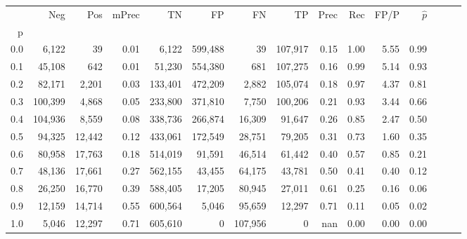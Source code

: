 \begin{tabular}{rrrrrrrrrrrrrrr}
\toprule
{} &      Neg &     Pos & mPrec &       TN &       FP &       FN &       TP &  Prec &   Rec &  FP/P & $\hat{p}$ \\
p   &          &         &       &          &          &          &          &       &       &       &           \\
\midrule
0.0 &    6,122 &      39 &  0.01 &    6,122 &  599,488 &       39 &  107,917 &  0.15 &  1.00 &  5.55 &      0.99 \\
0.1 &   45,108 &     642 &  0.01 &   51,230 &  554,380 &      681 &  107,275 &  0.16 &  0.99 &  5.14 &      0.93 \\
0.2 &   82,171 &   2,201 &  0.03 &  133,401 &  472,209 &    2,882 &  105,074 &  0.18 &  0.97 &  4.37 &      0.81 \\
0.3 &  100,399 &   4,868 &  0.05 &  233,800 &  371,810 &    7,750 &  100,206 &  0.21 &  0.93 &  3.44 &      0.66 \\
0.4 &  104,936 &   8,559 &  0.08 &  338,736 &  266,874 &   16,309 &   91,647 &  0.26 &  0.85 &  2.47 &      0.50 \\
0.5 &   94,325 &  12,442 &  0.12 &  433,061 &  172,549 &   28,751 &   79,205 &  0.31 &  0.73 &  1.60 &      0.35 \\
0.6 &   80,958 &  17,763 &  0.18 &  514,019 &   91,591 &   46,514 &   61,442 &  0.40 &  0.57 &  0.85 &      0.21 \\
0.7 &   48,136 &  17,661 &  0.27 &  562,155 &   43,455 &   64,175 &   43,781 &  0.50 &  0.41 &  0.40 &      0.12 \\
0.8 &   26,250 &  16,770 &  0.39 &  588,405 &   17,205 &   80,945 &   27,011 &  0.61 &  0.25 &  0.16 &      0.06 \\
0.9 &   12,159 &  14,714 &  0.55 &  600,564 &    5,046 &   95,659 &   12,297 &  0.71 &  0.11 &  0.05 &      0.02 \\
1.0 &    5,046 &  12,297 &  0.71 &  605,610 &        0 &  107,956 &        0 &   nan &  0.00 &  0.00 &      0.00 \\
\bottomrule
\end{tabular}
